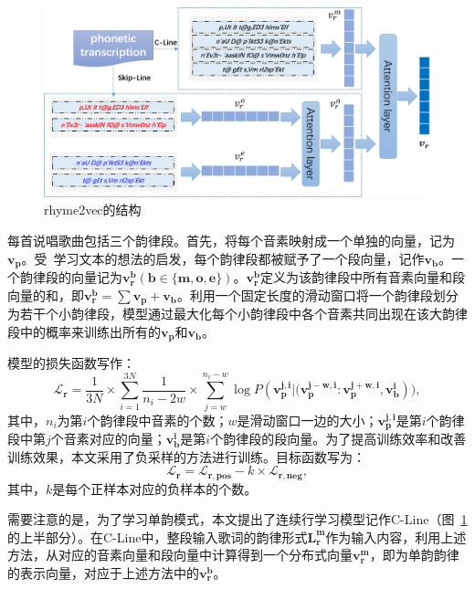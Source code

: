 \begin{figure}[h]
  \centering
  \includegraphics[width=1\textwidth]{rhyme.png}
  \caption{rhyme2vec的结构}
  \label{fig:rhyme2vec}
\end{figure}
每首说唱歌曲包括三个韵律段。首先，将每个音素映射成一个单独的向量，记为$\bm{v_p}$。受~\cite{quoc2014distributed}学习文本的想法的启发，每个韵律段都被赋予了一个段向量，记作$\bm {v_b}$。一个韵律段的向量记为$\bm {v_r^b} (\bm b \in \{\bm{m, o, e}\})$。$\bm {v_r^b}$定义为该韵律段中所有音素向量和段向量的和，即$\bm {v_r^b}=\sum\bm{v_{p}}+\bm{v_b}$。利用一个固定长度的滑动窗口将一个韵律段划分为若干个小韵律段，模型通过最大化每个小韵律段中各个音素共同出现在该大韵律段中的概率来训练出所有的$\bm {v_p}$和$\bm{v_b}$。\par

模型的损失函数写作：
\begin{equation}
\mathcal L_{\bm r} =\frac{1}{3N}\times \sum_{i=1}^{3N}\frac{1}{{n_i}-2w}\times \sum\limits_{j=w}^{n_i-w}\log P(\bm {v_p^{j,i}}|\bm {(v_p^{j-w,i}}: \bm {v_p^{j+w,i}}, \bm {v_b^{i}})),
\end{equation}
其中，$n_i$为第$i$个韵律段中音素的个数；$w$是滑动窗口一边的大小；$\bm {v_p^{j, i}}$是第$i$个韵律段中第$j$个音素对应的向量；$\bm {v_b^{i}}$是第$i$个韵律段的段向量。为了提高训练效率和改善训练效果，本文采用了负采样的方法进行训练。目标函数写为：
\begin{equation}
\bm{\mathcal{L}_r}=\bm{\mathcal{L}_{r,pos}}- k \times \bm{\mathcal{L}_{r,neg}},
\end{equation}
其中，$k$是每个正样本对应的负样本的个数。\par

需要注意的是，为了学习单韵模式，本文提出了连续行学习模型记作C-Line（图~\ref{fig:rhyme2vec}的上半部分）。在C-Line中，整段输入歌词的韵律形式$\bm{L_r^m}$作为输入内容，利用上述方法，从对应的音素向量和段向量中计算得到一个分布式向量$\bm{v_r^m}$，即为单韵韵律的表示向量，对应于上述方法中的$\bm {v_r^b}$。\par

